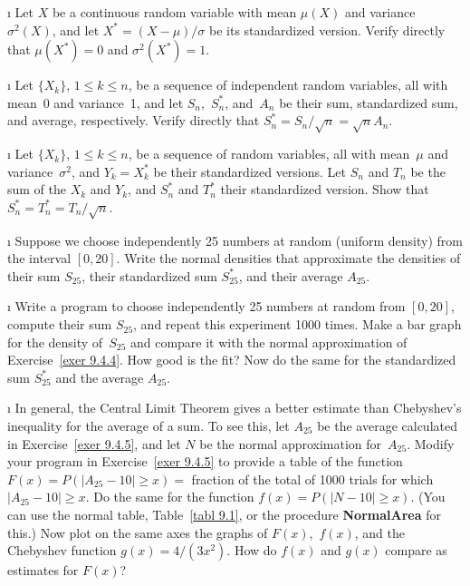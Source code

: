 \begin{LJSItem}

\i\label{exer 9.4.1}  Let $X$ be a continuous random variable with mean $\mu(X)$ and variance
$\sigma^2(X)$, and let $X^* = (X - \mu)/\sigma$ be its standardized version. 
Verify directly that $\mu(X^*) = 0$ and $\sigma^2(X^*) = 1$.

\i\label{exer 9.4.2}  Let $\{X_k\}$, $1 \leq k \leq n$, be a sequence of independent random
variables, all with mean~0 and variance~1, and let $S_n$,~$S_n^*$, and~$A_n$ be
their sum, standardized sum, and average, respectively.  Verify directly that
$S_n^* = S_n/\sqrt{n} = \sqrt{n} A_n$.

\i\label{exer 9.4.3}  Let $\{X_k\}$, $1 \leq k \leq n$, be a sequence of random variables, all with
mean~$\mu$ and variance~$\sigma^2$, and $Y_k = X_k^*$ be their standardized
versions.  Let $S_n$ and $T_n$ be the sum of the $X_k$ and $Y_k$, and $S_n^*$
and $T_n^*$ their standardized version.  Show that $S_n^* = T_n^* =
T_n/\sqrt{n}$.

\i\label{exer 9.4.4} Suppose we choose independently 25 numbers at random
(uniform density) from the interval $[0,20]$.  Write the normal densities that
approximate the densities of their sum $S_{25}$, their standardized sum
$S_{25}^*$, and their average $A_{25}$.

\i\label{exer 9.4.5} Write a program to choose independently 25 numbers at
random from $[0,20]$, compute their sum $S_{25}$, and repeat this experiment
1000 times.  Make a bar graph for the density of~$S_{25}$ and compare it with the
normal approximation of Exercise~\ref{exer 9.4.4}.  How good is the fit?  Now
do the same for the standardized sum $S_{25}^*$ and the average $A_{25}$.

\i\label{exer 9.4.6}  In general, the Central Limit Theorem gives a better estimate than
Chebyshev's inequality for the average of a sum.  To see this, let $A_{25}$ be
the average calculated in Exercise~\ref{exer 9.4.5}, and let $N$ be the normal
approximation for~$A_{25}$.  Modify your program in Exercise~\ref{exer 9.4.5}
to provide a table of the function $F(x) = P(|A_{25} - 10| \geq x) =
{}$ fraction of the total of 1000 trials for which $|A_{25} - 10| \geq x$.  Do
the same for the function $f(x) = P(|N - 10| \geq x)$.  (You can use the normal
table, Table~\ref{tabl 9.1}, or the procedure {\bf NormalArea} for this.) 
Now plot on the same axes the graphs of $F(x)$,~$f(x)$, and the Chebyshev
function $g(x) = 4/(3x^2)$.  How do $f(x)$ and $g(x)$ compare as estimates for
$F(x)$?


\end{LJSItem}
